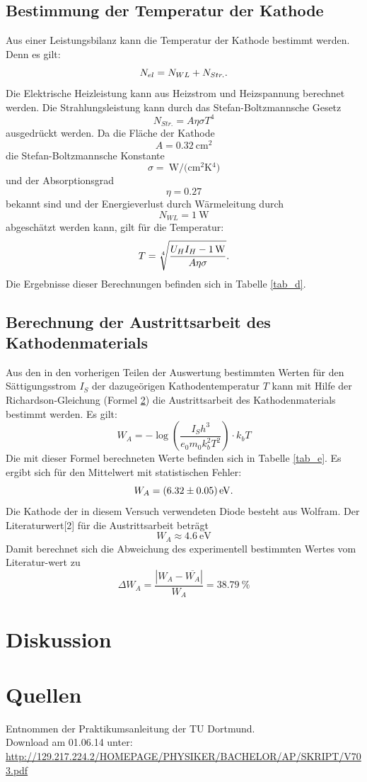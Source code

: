 \documentclass[11pt,ngerman,a4paper]{article}
\begin{document}
\subsection{Bestimmung der Temperatur der Kathode}

Aus einer Leistungsbilanz kann die Temperatur der Kathode bestimmt werden. Denn es gilt:
\[
N_{el} = N_{WL} + N_{Str.}\rm.
\]
Die Elektrische Heizleistung kann aus Heizstrom und Heizspannung berechnet werden. Die Strahlungsleistung kann durch das Stefan-Boltzmannsche Gesetz
\[
N_{Str.} = A \eta\sigma T^4
\]
ausgedrückt werden. Da die Fläche der Kathode 
\[
A = \SI{0,32}{\centi\meter\squared}
\]
die Stefan-Boltzmannsche Konstante 
\[
\sigma = \SI{}{\watt\per(\centi\meter\squared\kelvin^4)}
\]
und der Absorptionsgrad
\[
\eta = \num{0,27}
\]
bekannt sind und der Energieverlust durch Wärmeleitung durch
\[
N_{WL} = \SI{1}{\watt}
\]
abgeschätzt werden kann, gilt für die Temperatur:
\[
T = \sqrt[4]{\frac{U_H I_H - \SI{1}{\watt}}{A\eta\sigma}}\rm.
\]
Die Ergebnisse dieser Berechnungen befinden sich in Tabelle \ref{tab_d}.

\subsection{Berechnung der Austrittsarbeit des Kathodenmaterials}
Aus den in den vorherigen Teilen der Auswertung bestimmten Werten für den Sättigungsstrom $I_S$ der dazugeörigen Kathodentemperatur $T$ kann mit Hilfe der Richardson-Gleichung (Formel \ref{}) die Austrittsarbeit des Kathodenmaterials bestimmt werden. Es gilt:
\[
W_A = -\log\left( \frac{I_S h^3}{e_0 m_0 k_b^2 T^2}\right)\cdot k_b T
\]
Die mit dieser Formel berechneten Werte befinden sich in Tabelle \ref{tab_e}. Es ergibt sich für den Mittelwert mit statistischen Fehler:
\[
 W_A = \SI{6.32+-0.05}{\eV}\rm.
\]
Die Kathode der in diesem Versuch verwendeten Diode besteht aus Wolfram. Der Literaturwert[2] für die Austrittsarbeit beträgt
\[
W_A \approx \SI{4,6}{\eV}
\]
Damit berechnet sich die Abweichung des experimentell bestimmten Wertes vom Literatur-wert zu
\[
\Delta W_A = \frac{|W_A-\overline{W_A}|}{W_A} = \SI{38,79}{\percent} 
\]

\section{Diskussion}

\section{Quellen}
\begin{enumerate}[{[}1{]}]
\item Entnommen der Praktikumsanleitung \textit{} der TU Dortmund. \\
Download am 01.06.14 unter:\\
 \url{http://129.217.224.2/HOMEPAGE/PHYSIKER/BACHELOR/AP/SKRIPT/V703.pdf}
\end{enumerate}
\end{document}
